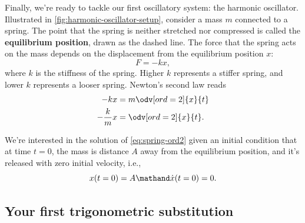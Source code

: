 Finally, we're ready to tackle our first oscillatory system: the harmonic oscillator. Illustrated in \cref{fig:harmonic-oscillator-setup}, consider a mass $m$ connected to a spring. The point that the spring is neither stretched nor compressed is called the \textbf{equilibrium position}, drawn as the dashed line. The force that the spring acts on the mass depends on the displacement from the equilibrium position $x$:
\begin{equation}
	F = -kx,
\end{equation}
where $k$ is the stiffness of the spring. Higher $k$ represents a stiffer spring, and lower $k$ represents a looser spring. Newton's second law reads
\begin{align}
	-kx           & = m\odv[ord = 2]{x}{t}                        \\
	-\frac{k}{m}x & = \odv[ord = 2]{x}{t}. \label{eq:spring-ord2}
\end{align}

We're interested in the solution of \cref{eq:spring-ord2} given an initial condition that at time $t = 0$, the mass is distance $A$ away from the equilibrium position, and it's released with zero initial velocity, i.e.,
\begin{equation}
	x(t = 0) = A \mathand \dot{x}(t = 0) = 0. \label{eq:spring-initial-condition}
\end{equation}

\subsection{Your first trigonometric substitution}

